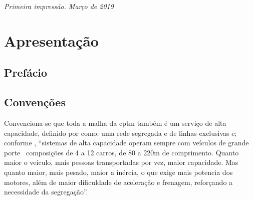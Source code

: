 \documentclass[11pt,fleqn]{book} %
\begin{document}
\vspace{0.5cm}

\noindent \textit{Primeira impressão. Março de 2019} %




\pagestyle{empty} %

\tableofcontents %

\cleardoublepage %

\pagestyle{fancy} %



\chapter*{Apresentação}

\section*{Prefácio}

\lipsum[1-2]

\section*{Convenções}

Convenciona-se que toda a malha da \gls{cptm} também é um serviço de alta capacidade, definido por \cite[p. 32]{Isoda} como: uma rede segregada e de linhas exclusivas e; conforme \cite[p. 51]{Isoda}, ``sistemas  de  alta  capacidade  operam  sempre  com  veículos  de  grande porte \textemdash\ composições de 4 a 12 carros, de 80 a 220m de comprimento. Quanto  maior  o  veículo,  mais  pessoas  transportadas  por  vez,  maior capacidade.  Mas  quanto  maior,  mais  pesado,  maior  a  inércia,  o  que exige  mais  potencia  dos  motores,  além  de  maior  dificuldade  de aceleração e frenagem, reforçando a necessidade da segregação''.
\end{document}
